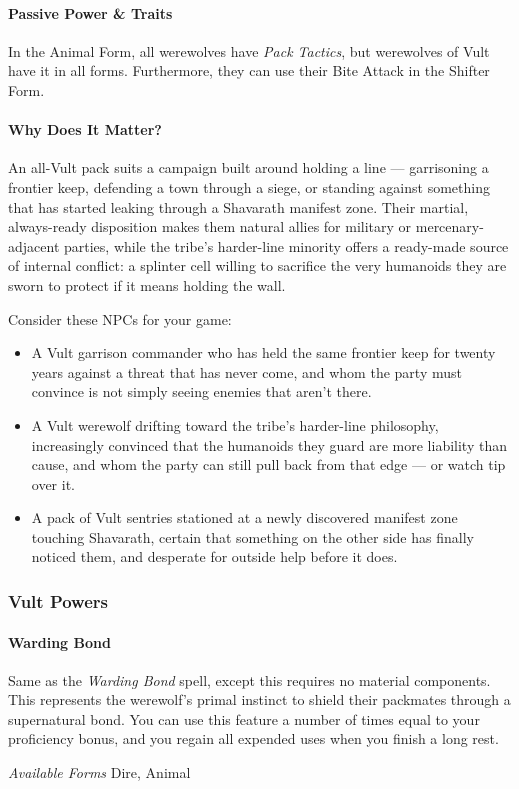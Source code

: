 \documentclass[twocolumn]{dndbook}
\begin{document}
\paragraph*{Passive Power \& Traits} In the Animal Form, all werewolves have \emph{Pack Tactics}, but werewolves of Vult have it in all forms.
Furthermore, they can use their Bite Attack in the Shifter Form.\par

\paragraph*{Why Does It Matter?} An all-Vult pack suits a campaign built around holding a line --- garrisoning a frontier keep, defending a town through a siege, or standing against something that has started leaking through a Shavarath manifest zone.
Their martial, always-ready disposition makes them natural allies for military or mercenary-adjacent parties, while the tribe's harder-line minority offers a ready-made source of internal conflict: a splinter cell willing to sacrifice the very humanoids they are sworn to protect if it means holding the wall.

Consider these NPCs for your game:
\begin{itemize}
    \item A Vult garrison commander who has held the same frontier keep for twenty years against a threat that has never come, and whom the party must convince is not simply seeing enemies that aren't there.
    \item A Vult werewolf drifting toward the tribe's harder-line philosophy, increasingly convinced that the humanoids they guard are more liability than cause, and whom the party can still pull back from that edge --- or watch tip over it.
    \item A pack of Vult sentries stationed at a newly discovered manifest zone touching Shavarath, certain that something on the other side has finally noticed them, and desperate for outside help before it does.
\end{itemize}


\subsubsection{Vult Powers}

\paragraph*{Warding Bond}
Same as the \emph{Warding Bond} spell, except this requires no material components.
This represents the werewolf's primal instinct to shield their packmates through a supernatural bond.
You can use this feature a number of times equal to your proficiency bonus, and you regain all expended uses when you finish a long rest.\par
\emph{Available Forms} Dire, Animal\par
\end{document}

